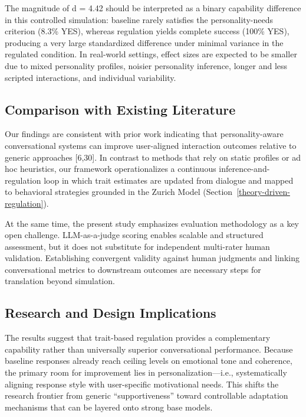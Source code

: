 \documentclass[apajournal,article,submit,moreauthors]{Definitions/mdpi}
\begin{document}
The magnitude of d = 4.42 should be interpreted as a binary capability difference in this controlled simulation: baseline rarely satisfies the personality-needs criterion (8.3\% YES), whereas regulation yields complete success (100\% YES), producing a very large standardized difference under minimal variance in the regulated condition. In real-world settings, effect sizes are expected to be smaller due to mixed personality profiles, noisier personality inference, longer and less scripted interactions, and individual variability.

\subsection{Comparison with Existing Literature}\label{comparison-with-existing-literature}

Our findings are consistent with prior work indicating that personality-aware conversational systems can improve user-aligned interaction outcomes relative to generic approaches {[}6,30{]}. In contrast to methods that rely on static profiles or ad hoc heuristics, our framework operationalizes a continuous inference-and-regulation loop in which trait estimates are updated from dialogue and mapped to behavioral strategies grounded in the Zurich Model (Section~\ref{theory-driven-regulation}).

At the same time, the present study emphasizes evaluation methodology as a key open challenge. LLM-as-a-judge scoring enables scalable and structured assessment, but it does not substitute for independent multi-rater human validation. Establishing convergent validity against human judgments and linking conversational metrics to downstream outcomes are necessary steps for translation beyond simulation.

\subsection{Research and Design Implications}\label{research-and-design-implications}

The results suggest that trait-based regulation provides a complementary capability rather than universally superior conversational performance. Because baseline responses already reach ceiling levels on emotional tone and coherence, the primary room for improvement lies in personalization---i.e., systematically aligning response style with user-specific motivational needs. This shifts the research frontier from generic ``supportiveness'' toward controllable adaptation mechanisms that can be layered onto strong base models.
\end{document}
